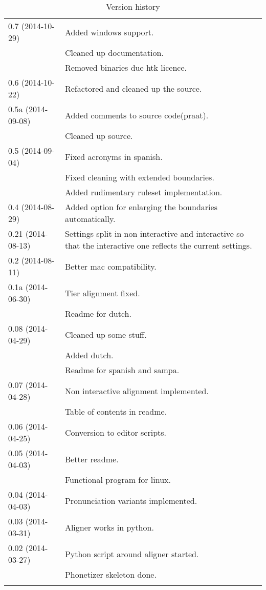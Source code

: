 \begin{longtable}{|p{0.22\linewidth}p{0.8\linewidth}|}
	\hline
	0.7 (2014-10-29) & \tabitem Added windows support.\\
		&	\tabitem Cleaned up documentation.\\
		& \tabitem Removed binaries due htk licence.\\
	\hline
	0.6 (2014-10-22) & \tabitem Refactored and cleaned up the source.\\
	\hline
	0.5a (2014-09-08) & \tabitem Added comments to source code(praat).\\
		& \tabitem Cleaned up source.\\
	\hline
	0.5 (2014-09-04) & \tabitem Fixed acronyms in spanish.\\
		& \tabitem Fixed cleaning with extended boundaries.\\
		& \tabitem Added rudimentary ruleset implementation.\\
	\hline
	0.4 (2014-08-29) & \tabitem Added option for enlarging the boundaries
automatically.\\
	\hline
	0.21 (2014-08-13) & \tabitem Settings split in non interactive and
interactive so that the interactive one reflects the current settings.\\
	\hline
	0.2 (2014-08-11) & \tabitem Better mac compatibility.\\
	\hline
	0.1a (2014-06-30) & \tabitem Tier alignment fixed.\\
		& \tabitem Readme for dutch.\\
	\hline
	0.08 (2014-04-29) & \tabitem Cleaned up some stuff.\\
		& \tabitem Added dutch.\\
		& \tabitem Readme for spanish and sampa.\\
	\hline
	0.07 (2014-04-28) & \tabitem Non interactive alignment implemented.\\
		& \tabitem Table of contents in readme.\\
	\hline
	0.06 (2014-04-25) & \tabitem Conversion to editor scripts.\\
	\hline
	0.05 (2014-04-03) & \tabitem Better readme.\\
		& \tabitem Functional program for linux.\\
	\hline
	0.04 (2014-04-03) & \tabitem Pronunciation variants implemented.\\
	\hline
	0.03 (2014-03-31) & \tabitem Aligner works in python.\\
	\hline
	0.02 (2014-03-27) & \tabitem Python script around aligner started.\\
		& \tabitem Phonetizer skeleton done.\\
	\hline
	\caption{Version history}
\end{longtable}





